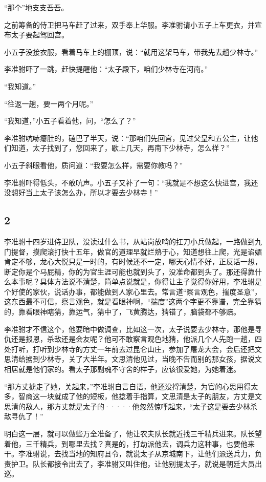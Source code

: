 “那个”地支支吾吾。

之前筹备的侍卫把马车赶了过来，双手奉上华服。李准驸请小五子上车更衣，并宣布太子要起驾回宫。

小五子没接衣服，看着马车上的棚顶，说：“就用这架马车，带我先去趟少林寺。”

李准驸吓了一跳，赶快提醒他：“太子殿下，咱们少林寺在河南。”

“我知道。”

“往返一趟，要一两个月呢。”

“我知道，”小五子看着他，问，“怎么了？”

李准驸吭哧瘪肚的，磕巴了半天，说：“那咱们先回宫，见过父皇和五公主，让他们知道，太子找到了，您回来了，歇上几天，再南下少林寺，怎么样？”

小五子斜眼看他，质问道：“我要怎么样，需要你教吗？”

李准驸吓得低头，不敢吭声。小五子又补了一句：“我就是不想这么快进宫，我还没想好当上太子该怎么办，所以才要去少林寺！”
\newline

{\centering\subsection{2}}

李准驸十四岁进侍卫队，没读过什么书，从站岗放哨的扛刀小兵做起，一路做到九门提督，摸爬滚打快十五年，做官的道理早就烂熟于心，知道想往上爬，光是谄媚肯定不够，龙心大悦只是一时的，有时候还不一定，哪天心情不好，正反话一想，断定你是个马屁精，你的为官生涯可能也就到头了，没准命都到头了。那还得靠什么本事呢？具体方法说不清楚，简单点说就是，你得让主子觉得你好用，李准驸是个好使的家伙，说话办事，都能做到人家心里去。常言道“察言观色，揣度圣意”，这东西最不可信，察言观色，就是看眼神啊，“揣度”这两个字更不靠谱，完全靠猜的，靠看眼神瞎猜，靠运气，猜中了，飞黄腾达，猜错了，脑袋都不够赔。

李准驸才不信这个，他要暗中做调查，比如这一次，太子说要去少林寺，那他是寻仇还是报恩，杀敌还是会友呢？他可不敢察言观色地猜，他派几个人先跑一趟，四处打听，打听到少林寺的方丈一年前去过昆仑山庄，参加了屠龙大会，会后还把文思清给掳到少林寺，关了大半年。文思清他见过，当晚不告而别的那女孩，据说文相居就是他们家的。看太子那副魂不守舍的样子，应该很爱她，为她着迷。

“那方丈掳走了她，关起来，”李准驸自言自语，他还没捋清楚，为官的心思用得太多，智商这一块就成了他的短板，他捻着手指算，文思清是太子的朋友，方丈是文思清的敌人，那方丈就是太子的·····他忽然惊呼起来，“太子这是要去少林杀敌寻仇了！”

明白这一层，就可以做些万全准备了，他让农夫队长就近找三千精兵进来。队长望着他，三千精兵，到哪里去找？真是的，打劫派他去，调兵力这种事，也要他来干。李准驸说，去找当地的知府县令，就说太子从京城南下，让他们派送兵力，负责护卫。队长都接令出去了，李准驸又叫住他，让他别提太子，就说是朝廷大员出巡。

